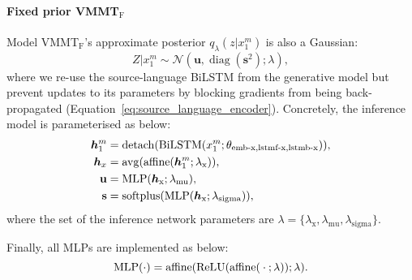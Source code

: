 \documentclass[11pt,a4paper]{article}
\DeclareMathOperator{\avg}{avg}
\DeclareMathOperator{\softplus}{softplus}
\DeclareMathOperator{\diag}{diag}
\DeclareMathOperator{\affine}{affine}
\DeclareMathOperator{\detach}{detach}
\DeclareMathOperator{\ReLU}{ReLU}
\DeclareMathOperator{\BiLSTM}{BiLSTM}
\DeclareMathOperator{\MLP}{MLP}
\newcommand{\uncond}{VMMT$_{\text{F}}$\xspace}
\begin{document}
\paragraph{Fixed prior \uncond}
Model \uncond's approximate posterior $q_\lambda(z | x^m_1)$ is also a Gaussian:
\begin{equation*}
	Z | x_1^m \sim \mathcal N(\mathbf u, \diag(\mathbf s^2); \lambda),
\end{equation*}
where we re-use the source-language BiLSTM from the generative model but prevent updates to its parameters by blocking gradients from being back-propagated (Equation~\ref{eq:source_language_encoder}).
Concretely, the inference model is parameterised as below:
\begin{align}
    \bm{h}_1^m &= \detach(\BiLSTM(x_1^m; \theta_\text{emb-x,lstmf-x,lstmb-x})), \notag\\
    \bm{h}_x &= \avg(\affine(\bm{h}_1^m; \lambda_\text{x})), \notag\\
    \mathbf u &= \MLP(\bm{h}_\text{x}; \lambda_\text{mu}), \notag\\
    \mathbf s &= \softplus(\MLP(\bm{h}_\text{x}; \lambda_\text{sigma})), \notag
\end{align}
where the set of the inference network parameters are $\lambda = \{ \lambda_\text{x}, \lambda_\text{mu}, \lambda_\text{sigma} \}$.

Finally, all MLPs are implemented as below:
\begin{equation}
    \MLP(\cdot) = \affine(\ReLU(\affine(\: \cdot\: ; \lambda)); \lambda).\notag
\end{equation} 
\end{document}
